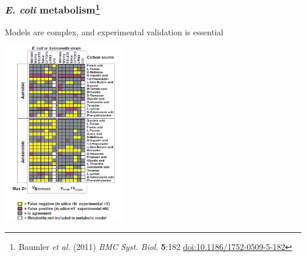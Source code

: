 \begin{frame}
  \frametitle{\textit{E. coli} metabolism\footnote{\tiny{Baumler \textit{et al.} (2011) \textit{BMC Syst. Biol.} \textbf{5}:182 \href{http://dx.doi.org/10.1186/1752-0509-5-182}{doi:10.1186/1752-0509-5-182}}}}
  Models are complex, and experimental validation is essential
  \begin{center}
      \includegraphics[width=0.4\textwidth]{images/e_coli_carbon_source} 
  \end{center}
\end{frame}